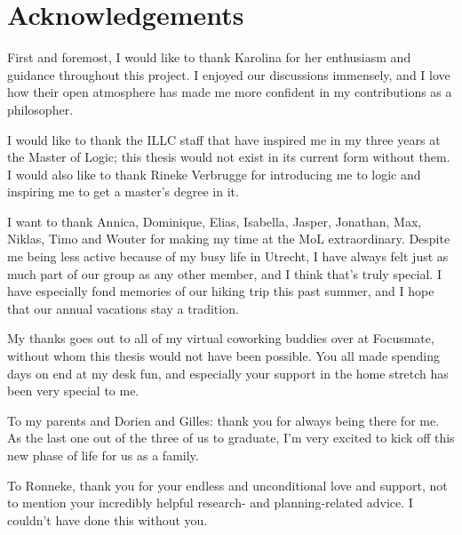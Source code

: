 \chapter*{Acknowledgements}

First and foremost, I would like to thank Karolina for her enthusiasm and guidance throughout this project. I enjoyed our discussions immensely, and I love how their open atmosphere has made me more confident in my contributions as a philosopher.

I would like to thank the ILLC staff that have inspired me in my three years at the Master of Logic; this thesis would not exist in its current form without them.
I would also like to thank Rineke Verbrugge for introducing me to logic and inspiring me to get a master's degree in it.

I want to thank Annica, Dominique, Elias, Isabella, Jasper, Jonathan, Max, Niklas, Timo and Wouter for making my time at the MoL extraordinary. Despite me being less active because of my busy life in Utrecht, I have always felt just as much part of our group as any other member, and I think that's truly special. I have especially fond memories of our hiking trip this past summer, and I hope that our annual vacations stay a tradition.

My thanks goes out to all of my virtual coworking buddies over at Focusmate, without whom this thesis would not have been possible. You all made spending days on end at my desk fun, and especially your support in the home stretch has been very special to me.

To my parents and Dorien and Gilles: thank you for always being there for me. As the last one out of the three of us to graduate, I'm very excited to kick off this new phase of life for us as a family.

To Ronneke, thank you for your endless and unconditional love and support, not to mention your incredibly helpful research- and planning-related advice. I couldn't have done this without you.
